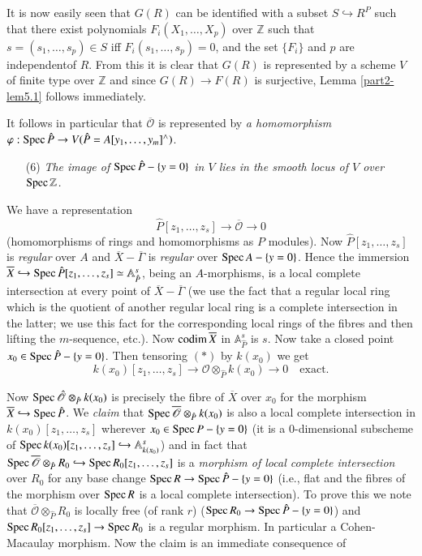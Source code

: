 It is now easily seen that $G(R)$ can be identified with a subset
$S\hookrightarrow R^{P}$ such that there exist polynomials
$F_{i}(X_{1},\ldots,X_{p})$ over $\mathbb{Z}$ such that
$s=(s_{1},\ldots,s_{p})\in S$ iff $F_{i}(s_{1},\ldots,s_{p})=0$, and
the set $\{F_{i}\}$ and $p$ are independent\pageoriginale of $R$. From
this it is clear that $G(R)$ is represented by a scheme $V$ of finite
type over $\mathbb{Z}$ and since $G(R)\to F(R)$ is surjective, Lemma
\ref{part2-lem5.1} follows immediately.

It follows in particular that $\overline{\mathscr{O}}$ is represented
by {\em a homomorphism} $\varphi:\operatorname{Spec} \hat{P}\to
V(\hat{P}=A[y_{1},\ldots,y_{m}]^{\wedge})$. 
\begin{itemize}
\item[(6)] {\em The image of $\operatorname{Spec} \hat{P}-\{y=0\}$ in $V$ lies in
  the smooth locus of $V$ over $\operatorname{Spec} \mathbb{Z}$.}
\end{itemize}

We have a representation
\begin{equation*}
\hat{P}[z_{1},\ldots,z_{s}]\to \overline{\mathscr{O}}\to 0\tag{*}
\end{equation*}
(homomorphisms of rings and homomorphisms as $P$ modules). Now
$\hat{P}[z_{1},\ldots,z_{s}]$ is {\em regular} over $A$ and
$\overline{X}-\overline{\Gamma}$ is {\em regular} over $\operatorname{Spec}
A-\{y=0\}$. Hence the immersion $\overline{X}\hookrightarrow \operatorname{Spec}
\hat{P}[z_{1},\ldots,z_{s}]\simeq \mathbb{A}^{s}_{\hat{P}}$, being an
$A$-morphisms, is a local complete intersection at every point of
$\overline{X}-\overline{\Gamma}$ (we use the fact that a regular local
ring which is the quotient of another regular local ring is a complete
intersection in the latter; we use this fact for the corresponding
local rings of the fibres and then lifting the $m$-sequence,
etc.). Now $\operatorname{codim} \overline{X}$ in $\mathbb{A}^{s}_{\hat{P}}$ is
$s$. Now take a closed point $x_{0}\in \operatorname{Spec} \hat{P}-\{y=0\}$. Then
tensoring $(*)$ by $k(x_{0})$ we get
$$
k(x_{0})[z_{1},\ldots,z_{s}]\to
\mathscr{O}\otimes_{\hat{P}}k(x_{0})\to 0\quad\text{exact.}
$$

Now $\operatorname{Spec} \hat{\mathscr{O}}\otimes_{\hat{P}}k(x_{0})$ is precisely
the fibre of $\overline{X}$ over $x_{0}$ for the morphism
$\overline{X}\hookrightarrow \operatorname{Spec} \hat{P}$. We {\em claim} that
$\operatorname{Spec} \overline{\mathscr{O}}\otimes_{\hat{P}}k(x_{0})$ is also a
local complete intersection in $k(x_{0})[z_{1},\ldots,z_{s}]$ wherever
$x_{0}\in \operatorname{Spec} P-\{y=0\}$ (it is a $0$-dimensional\pageoriginale
subscheme of $\operatorname{Spec} k(x_{0})[z_{1},\ldots,z_{s}]\hookrightarrow
\mathbb{A}^{s}_{k(x_{0})}$) and in fact that $\operatorname{Spec}
\overline{\mathscr{O}}\otimes_{\hat{P}}R_{0}\hookrightarrow \operatorname{Spec}
R_{0}[z_{1},\ldots,z_{s}]$ is a {\em morphism of local complete
  intersection} over $R_{0}$ for any base change $\operatorname{Spec} R\to \operatorname{Spec}
\hat{P}-\{y=0\}$ (i.e., flat and the fibres of the morphism over
$\operatorname{Spec} R$ is a local complete intersection). To prove this we note
that $\overline{\mathscr{O}}\otimes_{\hat{P}}R_{0}$ is locally free
(of rank $r$) ($\operatorname{Spec} R_{0}\to \operatorname{Spec}\hat{P}-\{y=0\}$) and $\operatorname{Spec}
R_{0}[z_{1},\ldots,z_{s}]\to \operatorname{Spec} R_{0}$ is a regular morphism. In
particular a Cohen-Macaulay morphism. Now the claim is an immediate
consequence of

